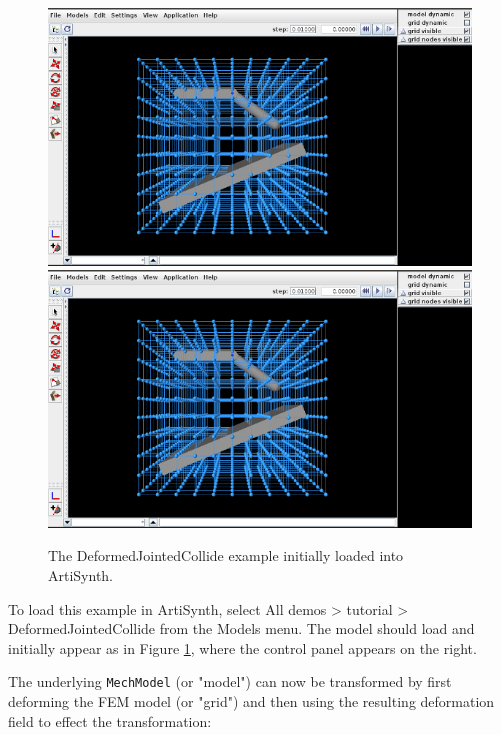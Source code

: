 \begin{figure}[ht]
\begin{center}
\iflatexml
 \includegraphics[]{images/DeformedJointedCollide}
\else
 \includegraphics[width=5in]{images/DeformedJointedCollide}
\fi
\end{center}
\caption{The DeformedJointedCollide example initially loaded
into ArtiSynth.}
\label{DeformedJointedCollide:fig}
\end{figure}

To load this example in ArtiSynth, select {\sf All demos > tutorial >
DeformedJointedCollide} from the {\sf Models} menu. The model should load and
initially appear as in Figure \ref{DeformedJointedCollide:fig}, where
the control panel appears on the right.

The underlying {\tt MechModel} (or "model") can now be
transformed by first deforming the FEM model (or "grid") and
then using the resulting deformation field to effect the
transformation:

